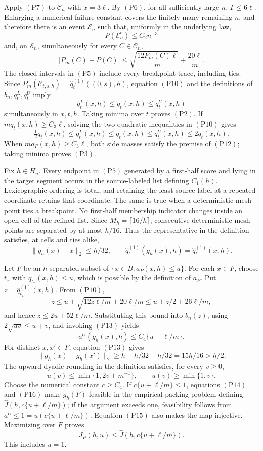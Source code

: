 Apply \((\mathrm{P7})\) to \(\mathcal C_n\) with \(x=3\ell\).  By
\((\mathrm{P6})\), for all sufficiently large \(n\),
\(\Gamma\leq6\ell\).  Enlarging a numerical failure constant covers the
finitely many remaining \(n\), and therefore there is an event
\(\mathcal E_n\) such that, uniformly in the underlying law,
\[
 P(\mathcal E_n^c)\leq C_2n^{-3}
 \tag{P9}
\]
and, on \(\mathcal E_n\), simultaneously for every \(C\in\mathcal C_n\),
\[
 |P_m(C)-P(C)|\leq
 \sqrt{\frac{12P_m(C)\ell}{m}}+\frac{20\ell}{m}.
 \tag{P10}
\]
The closed intervals in \((\mathrm{P5})\) include every breakpoint trace,
including ties.  Since
\(P_m(\mathcal C_{t,s,h})=\widehat q_t^{(1)}((0,s),h)\), equation
\((\mathrm{P10})\) and the definitions of \(b_n,q_t^L,q_t^U\) imply
\[
 q_t^L(x,h)\leq q_t(x,h)\leq q_t^U(x,h)
 \tag{P11}
\]
simultaneously in \(x,t,h\).  Taking minima over \(t\) proves
\((\mathrm{P2})\).  If \(mq_t(x,h)\geq C_3\ell\), solving the two quadratic
inequalities in \((\mathrm{P10})\) gives
\[
 \tfrac12q_t(x,h)\leq q_t^L(x,h)\leq q_t(x,h)
 \leq q_t^U(x,h)\leq2q_t(x,h).
 \tag{P12}
\]
When \(ma_P(x,h)\geq C_3\ell\), both side masses satisfy the premise of
\((\mathrm{P12})\); taking minima proves \((\mathrm{P3})\).

Fix \(h\in H_n\).  Every endpoint in \((\mathrm{P5})\) generated by a
first-half score and lying in the target segment occurs in the source-labeled
list defining \(C_1(h)\).  Lexicographic ordering is total, and retaining
the least source label at a repeated coordinate retains that coordinate.
The same is true when a deterministic mesh point ties a breakpoint.  No
first-half membership indicator changes inside an open cell of the refined
list.  Since \(M_h=\lceil16/h\rceil\), consecutive deterministic mesh
points are separated by at most \(h/16\).  Thus the representative in the
definition satisfies, at cells and ties alike,
\[
 \|g_h(x)-x\|_2\leq h/32,
 \qquad
 \widehat q_t^{(1)}(g_h(x),h)=\widehat q_t^{(1)}(x,h).
 \tag{P13}
\]

Let \(F\) be an \(h\)-separated subset of
\(\{x\in B:a_P(x,h)\leq u\}\).  For each \(x\in F\), choose
\(t_x\) with \(q_{t_x}(x,h)\leq u\), which is possible by the definition
of \(a_P\).  Put \(z=\widehat q_{t_x}^{(1)}(x,h)\).  From
\((\mathrm{P10})\),
\[
 z\leq u+\sqrt{12z\ell/m}+20\ell/m
 \leq u+z/2+26\ell/m,
\]
and hence \(z\leq2u+52\ell/m\).  Substituting this bound into \(b_n(z)\),
using \(2\sqrt{uv}\leq u+v\), and invoking \((\mathrm{P13})\) yields
\[
 a^U(g_h(x),h)\leq C_4\{u+\ell/m\}.
 \tag{P14}
\]
For distinct \(x,x'\in F\), equation \((\mathrm{P13})\) gives
\[
 \|g_h(x)-g_h(x')\|_2
 \geq h-h/32-h/32=15h/16>h/2.
 \tag{P15}
\]
The upward dyadic rounding in the definition satisfies, for every
\(v\geq0\),
\[
 u(v)\leq\min\{1,2v+m^{-1}\},
 \qquad
 u(v)\geq\min\{1,v\}.
 \tag{P16}
\]
Choose the numerical constant \(c\geq C_4\).  If
\(c\{u+\ell/m\}\leq1\), equations \((\mathrm{P14})\) and
\((\mathrm{P16})\) make \(g_h(F)\) feasible in the empirical packing
problem defining \(\widehat J(h,c\{u+\ell/m\})\); if the argument exceeds
one, feasibility follows from \(a^U\leq1=u(c\{u+\ell/m\})\).
Equation \((\mathrm{P15})\) also makes the map injective.  Maximizing over
\(F\) proves
\[
 J_P(h,u)\leq\widehat J(h,c\{u+\ell/m\}).
 \tag{P17}
\]
This includes \(u=1\).

